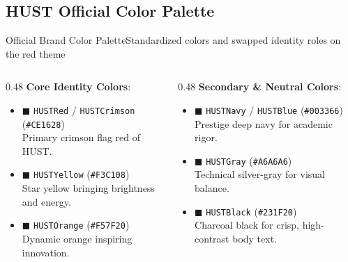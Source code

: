\documentclass[aspectratio=43,10pt]{beamer}
\begin{document}
\subsection{HUST Official Color Palette}
\begin{frame}{Official Brand Color Palette}{Standardized colors and swapped identity roles on the red theme}
  \small
  \begin{columns}[T]
    \begin{column}{0.48\textwidth}
      \textbf{Core Identity Colors}:
      \begin{itemize}\setlength{\itemsep}{3pt}
        \item \textcolor{HUSTRed}{$\blacksquare$ \texttt{HUSTRed} / \texttt{HUSTCrimson}} (\texttt{\#CE1628})\\
          \scriptsize Primary crimson flag red of HUST.
        \item \textcolor{HUSTYellow}{$\blacksquare$ \texttt{HUSTYellow}} (\texttt{\#F3C108})\\
          \scriptsize Star yellow bringing brightness and energy.
        \item \textcolor{HUSTOrange}{$\blacksquare$ \texttt{HUSTOrange}} (\texttt{\#F57F20})\\
          \scriptsize Dynamic orange inspiring innovation.
      \end{itemize}
    \end{column}

    \begin{column}{0.48\textwidth}
      \textbf{Secondary \& Neutral Colors}:
      \begin{itemize}\setlength{\itemsep}{3pt}
        \item \textcolor{HUSTNavy}{$\blacksquare$ \texttt{HUSTNavy} / \texttt{HUSTBlue}} (\texttt{\#003366})\\
          \scriptsize Prestige deep navy for academic rigor.
        \item \textcolor{HUSTGray}{$\blacksquare$ \texttt{HUSTGray}} (\texttt{\#A6A6A6})\\
          \scriptsize Technical silver-gray for visual balance.
        \item \textcolor{HUSTBlack}{$\blacksquare$ \texttt{HUSTBlack}} (\texttt{\#231F20})\\
          \scriptsize Charcoal black for crisp, high-contrast body text.
      \end{itemize}
    \end{column}
  \end{columns}
\end{frame}
\end{document}
